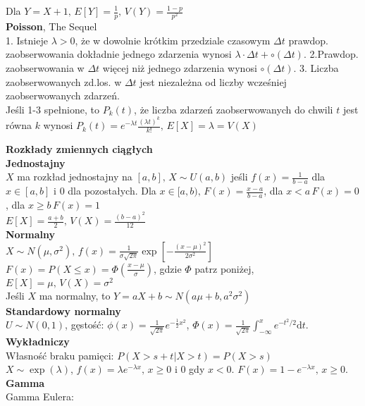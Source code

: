 \documentclass[10pt,landscape,a4paper,notitlepage]{article}
\begin{document}
\begin{multicols*}{4}
        Dla $Y=X+1,\,E[Y]=\frac{1}{p},\,V(Y)=\frac{1-p}{p^2}$\\
        \textbf{Poisson}, The Sequel\\
        1. Istnieje $\lambda>0$, że w dowolnie krótkim przedziale czasowym $\Delta t$ prawdop. zaobserwowania dokładnie jednego zdarzenia wynosi $\lambda\cdot\Delta t+\circ(\Delta t)$.
        2.Prawdop. zaobserwowania w $\Delta t$ więcej niż jednego zdarzenia wynosi $\circ(\Delta t)$.
        3. Liczba zaobserwowanych zd.los. w $\Delta t$ jest niezależna od liczby wcześniej zaobserwowanych zdarzeń.\\
        Jeśli 1-3 spełnione, to $P_k(t)$, że liczba zdarzeń zaobserwowanych do chwili $t$ jest równa $k$ wynosi $P_k(t)=e^{-\lambda t}\frac{(\lambda t)^k}{k!},\,E[X]=\lambda=V(X)$

        \noindent\textbf{\large Rozkłady zmiennych ciągłych}\\
        \textbf{Jednostajny}\\
        $X$ ma rozkład jednostajny na $[a,b],\,X\sim U(a,b)$ jeśli $f(x)=\frac{1}{b-a}$ dla $x\in[a,b]$ i $0$ dla pozostałych.
        Dla $x\in[a,b),\,F(x)=\frac{x-a}{b-a}$, dla $x<a\,F(x)=0$, dla $x\geq b\, F(x)=1$\\
        $E[X]=\frac{a+b}{2},\,V(X)=\frac{(b-a)^2}{12}$\\
        \textbf{Normalny}\\
        $X\sim N(\mu, \sigma^2),\,f(x)=\frac{1}{\sigma\sqrt{2\pi}}\exp\left[-\frac{(x-\mu)^2}{2\sigma^2}\right]$\\
        $F(x)=P(X\leq x)=\Phi(\frac{x-\mu}{\sigma})$, gdzie $\Phi$ patrz poniżej,
        $E[X]=\mu,\,V(X)=\sigma^2$\\
        Jeśli $X$ ma normalny, to $Y=aX+b\sim N(a\mu+b,a^2\sigma^2)$\\
        \textbf{Standardowy normalny}\\
        $U\sim N(0,1)$, gęstość: $\phi(x)=\frac{1}{\sqrt{2\pi}}e^{-\frac{1}{2}x^2}$, $\Phi(x)=\frac{1}{\sqrt{2\pi}}\int_{-\infty}^xe^{-t^2/2}\mathrm{d}t$.\\
        \textbf{Wykładniczy}\\
        Własność braku pamięci: $P(X>s+t|X>t)=P(X>s)$\\
        $X\sim \exp(\lambda)$, $f(x)=\lambda e^{-\lambda x},\,x\geq 0$ i $0$ gdy $x<0$.
        $F(x)=1-e^{-\lambda x},\,x\geq 0$.\\
        \textbf{Gamma}\\
        Gamma Eulera:\\

\end{multicols*}
\end{document}
